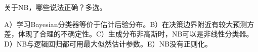 关于NB，哪些说法正确？多选。


A）学习Bayesian分类器等价于估计后验分布。B）在决策边界附近有较大预测方差，体现了合理的不确定性。C）生成分布非高斯时，NB可以是非线性分类器。D）NB与逻辑回归都可用最大似然估计参数。E）NB没有正则化。
